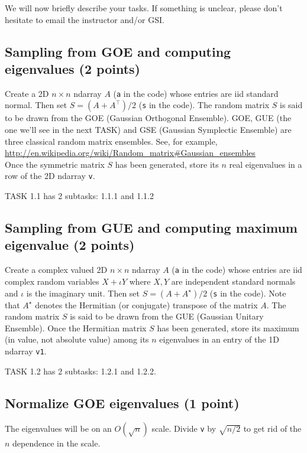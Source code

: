 \documentclass{article}
\begin{document}
We will now briefly describe your tasks. If something is unclear, please don't hesitate to email the instructor and/or GSI.

\subsection{Sampling from GOE and computing eigenvalues (2 points)}

Create a 2D $n \times n$ ndarray $A$ (\verb#a# in the code) whose entries are iid standard normal. Then set $S = (A+A^\top)/2$ (\verb#s# in the code). The random matrix $S$ is said to be drawn from the GOE (Gaussian Orthogonal
Ensemble). GOE, GUE (the one we'll see in the next TASK) and GSE (Gaussian Symplectic Ensemble) are three classical random matrix ensembles. See, for example, \\
\url{http://en.wikipedia.org/wiki/Random_matrix#Gaussian_ensembles}\\
Once the symmetric matrix $S$ has been generated, store its $n$ real eigenvalues in a row of the 2D ndarray \verb#v#.

TASK 1.1 has 2 subtasks: 1.1.1 and 1.1.2

\subsection{Sampling from GUE and computing maximum eigenvalue (2 points)}

Create a complex valued 2D $n \times n$ ndarray $A$ (\verb#a# in the code) whose entries are iid complex random variables $X+ \iota Y$ where $X, Y$ are independent standard normals and $\iota$ is the imaginary unit. Then set $S = (A+A^\star)/2$ (\verb#s# in the code). Note that $A^\star$ denotes the Hermitian (or conjugate) transpose of the matrix $A$. The random matrix $S$ is said to be drawn from the GUE (Gaussian Unitary
Ensemble).
Once the Hermitian matrix $S$ has been generated, store its maximum (in value, not absolute value) among its $n$ eigenvalues in an entry of the 1D ndarray \verb#v1#.

TASK 1.2 has 2 subtasks: 1.2.1 and 1.2.2.

\subsection{Normalize GOE eigenvalues (1 point)}

The eigenvalues will be on an $O(\sqrt{n})$ scale. Divide \verb#v# by $\sqrt{n/2}$ to get rid of the $n$ dependence in the scale.
\end{document}
